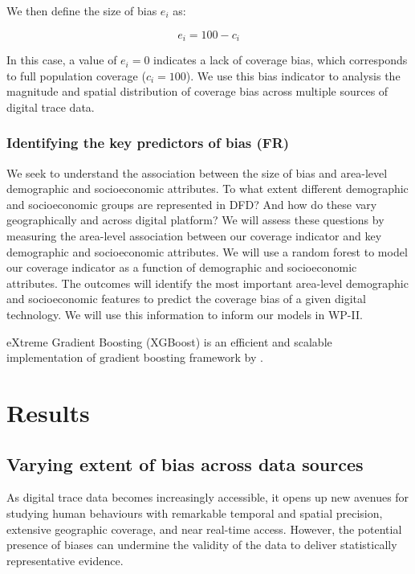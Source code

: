 \documentclass[]{rsos}%
\begin{document}
We then define the size of bias \(e_i\) as:

\begin{equation} \label{eq:size-bias}
e_i = 100 - c_i
\end{equation}

In this case, a value of \(e_i = 0\) indicates a lack of coverage bias,
which corresponds to full population coverage (\(c_i = 100\)). We use this
bias indicator to analysis the magnitude and spatial distribution of
coverage bias across multiple sources of digital trace data.

\subsubsection{Identifying the key predictors of bias (FR)}\label{identifying-the-key-predictors-of-bias-fr}

We seek to understand the association between the size of bias and
area-level demographic and socioeconomic attributes. To what extent
different demographic and socioeconomic groups are represented in DFD?
And how do these vary geographically and across digital platform? We
will assess these questions by measuring the area-level association
between our coverage indicator and key demographic and socioeconomic
attributes. We will use a random forest to model our coverage indicator
as a function of demographic and socioeconomic attributes. The outcomes
will identify the most important area-level demographic and
socioeconomic features to predict the coverage bias of a given digital
technology. We will use this information to inform our models in WP-II.

eXtreme Gradient Boosting (XGBoost) is an efficient and scalable
implementation of gradient boosting framework by \citep{friedman2001, friedman2000}.

\section{Results}\label{results}

\subsection{Varying extent of bias across data sources}\label{varying-extent-of-bias-across-data-sources}

As digital trace data becomes increasingly accessible, it opens up new
avenues for studying human behaviours with remarkable temporal and
spatial precision, extensive geographic coverage, and near real-time
access. However, the potential presence of biases can undermine the
validity of the data to deliver statistically representative evidence.
\end{document}
